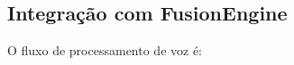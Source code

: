\documentclass{report}
\begin{document}

\subsection{Integração com FusionEngine}

O fluxo de processamento de voz é:
\end{document}
